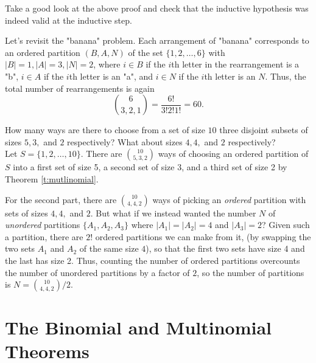 \documentclass[11pt,dvipsnames]{book}
\numberwithin{figure}{section} %
\numberwithin{table}{section} %
\begin{document}
Take a good look at the above proof and check that the inductive hypothesis was indeed valid at the inductive step.

\begin{example}
Let's revisit the "banana" problem. Each arrangement of "banana" corresponds to an ordered partition $(B,A,N)$ of the set $\{1,2, \dots ,6\}$ with $|B|=1,|A|=3,|N|=2$, where $i\in B$ if the $i$th letter in the rearrangement is a "b", $i\in A$ if the $i$th letter is an "a", and $i\in N$ if the $i$th letter is an $N$. Thus, the total number of rearrangements is again
\[
{6 \choose 3 , 2, 1} = \frac{6!}{3!2!1!}=60.
\]
\end{example}

\begin{example}
How many ways are there to choose from a set of size $10$ three disjoint subsets of sizes $5,3,$ and $2$ respectively? What about sizes $4,4,$ and $2$ respectively? \\

Let $S=\{1,2,\dots,10\}$. There are ${10\choose 5,3,2}$ ways of choosing an ordered partition of $S$ into a first set of size 5, a second set of size 3, and a third set of size 2 by Theorem \ref{t:mutlinomial}.


For the second part, there are ${10\choose 4,4,2}$ ways of picking an {\it ordered} partition with sets of sizes $4,4,$ and $2$. But what if we instead wanted the number $N$ of {\it unordered} partitions $\{A_{1},A_{2},A_{3}\}$ where $|A_{1}|=|A_{2}|=4$ and $|A_{3}|=2$? Given such a partition, there are $2!$ ordered partitions we can make from it, (by swapping the two sets $A_1$ and $A_2$ of the same size $4$), so that the first two sets have size 4 and the last has size 2.
Thus, counting the number of ordered partitions overcounts the number of unordered partitions by a factor of $2$, so the number of partitions is $N= {10\choose 4,4,2}/2$.

\end{example}

\section{The Binomial and Multinomial Theorems}
\end{document}
